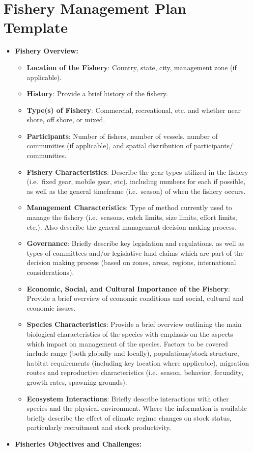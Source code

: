 \documentclass[]{book}
\begin{document}
\section{Fishery Management Plan
Template}\label{fishery-management-plan-template}

\begin{itemize}
\item
  \textbf{Fishery Overview:}

  \begin{itemize}
  \item
    \textbf{Location of the Fishery}: Country, state, city, management
    zone (if applicable).
  \item
    \textbf{History}: Provide a brief history of the fishery.
  \item
    \textbf{Type(s) of Fishery}: Commercial, recreational, etc. and
    whether near shore, off shore, or mixed.
  \item
    \textbf{Participants}: Number of fishers, number of vessels, number
    of communities (if applicable), and spatial distribution of
    participants/ communities.
  \item
    \textbf{Fishery Characteristics}: Describe the gear types utilized
    in the fishery (i.e.~fixed gear, mobile gear, etc), including
    numbers for each if possible, as well as the general timeframe
    (i.e.~season) of when the fishery occurs.
  \item
    \textbf{Management Characteristics}: Type of method currently used
    to manage the fishery (i.e.~seasons, catch limits, size limits,
    effort limits, etc.). Also describe the general management
    decision-making process.
  \item
    \textbf{Governance}: Briefly describe key legislation and
    regulations, as well as types of committees and/or legislative land
    claims which are part of the decision making process (based on
    zones, areas, regions, international considerations).
  \item
    \textbf{Economic, Social, and Cultural Importance of the Fishery}:
    Provide a brief overview of economic conditions and social, cultural
    and economic issues.
  \item
    \textbf{Species Characteristics}: Provide a brief overview outlining
    the main biological characteristics of the species with emphasis on
    the aspects which impact on management of the species. Factors to be
    covered include range (both globally and locally), populations/stock
    structure, habitat requirements (including key location where
    applicable), migration routes and reproductive characteristics
    (i.e.~season, behavior, fecundity, growth rates, spawning grounds).
  \item
    \textbf{Ecosystem Interactions}: Briefly describe interactions with
    other species and the physical environment. Where the information is
    available briefly describe the effect of climate regime changes on
    stock status, particularly recruitment and stock productivity.
  \end{itemize}
\item
  \textbf{Fisheries Objectives and Challenges:}
\end{itemize}
\end{document}
